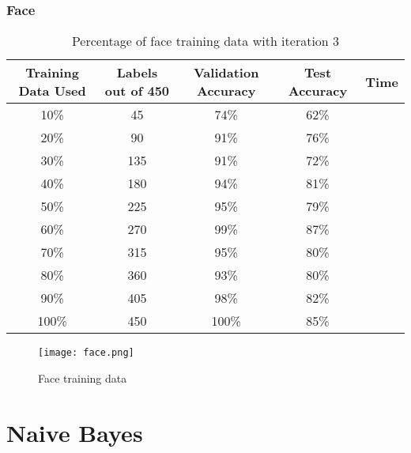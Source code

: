 \documentclass{article}
\begin{document}
        \subsubsection{Face}
            \begin{table}[h]
                \centering
                \begin{tabular}{c|c|c|c|c}
                    \hline
                        Training Data Used & Labels out of 450 & Validation Accuracy & Test Accuracy & Time\\
                    \hline
                        10\% & 45 & 74\% & 62\%\\
                    \hline
                        20\% & 90 & 91\% & 76\%\\
                    \hline
                        30\% & 135 & 91\% & 72\%\\
                    \hline
                        40\% & 180 & 94\% & 81\%\\
                    \hline
                        50\% & 225 & 95\% & 79\%\\
                    \hline
                        60\% & 270 & 99\% & 87\%\\
                    \hline
                        70\% & 315 & 95\% & 80\%\\
                    \hline
                        80\% & 360 & 93\% & 80\%\\
                    \hline
                        90\% & 405 & 98\% & 82\%\\
                    \hline
                        100\% & 450 & 100\% & 85\%\\
                    \hline
                \end{tabular}
                \caption{Percentage of face training data with iteration 3}
            \end{table}
            
            \begin{figure}[h]
                \centering
                \texttt{[image: face.png]}
                \caption{Face training data}
            \end{figure}
        \newpage

\section{Naive Bayes}
\end{document}
